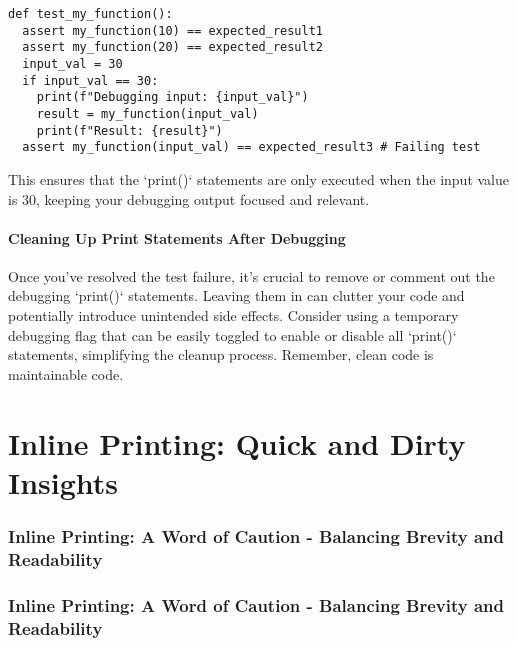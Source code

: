 \documentclass{article}
\begin{document}
{{{{\begin{verbatim}
def test_my_function():
  assert my_function(10) == expected_result1
  assert my_function(20) == expected_result2
  input_val = 30
  if input_val == 30:
    print(f"Debugging input: {input_val}")
    result = my_function(input_val)
    print(f"Result: {result}")
  assert my_function(input_val) == expected_result3 # Failing test
\end{verbatim}

This ensures that the `print()` statements are only executed when the input value is 30, keeping your debugging output focused and relevant.

\subsection*{Cleaning Up Print Statements After Debugging}

Once you've resolved the test failure, it's crucial to remove or comment out the debugging `print()` statements. Leaving them in can clutter your code and potentially introduce unintended side effects. Consider using a temporary debugging flag that can be easily toggled to enable or disable all `print()` statements, simplifying the cleanup process. Remember, clean code is maintainable code.


\part*{Inline Printing: Quick and Dirty Insights} %
\label{part-6-Inline_Printing__Quick_and_Dirty_Insight}


\section*{Inline Printing: A Word of Caution - Balancing Brevity and Readability} %
\label{chapter-6-1-Inline_Printing__A_Word_of_Caution_-_Bal}

\section*{Inline Printing: A Word of Caution - Balancing Brevity and Readability}

}}}}
\end{document}
